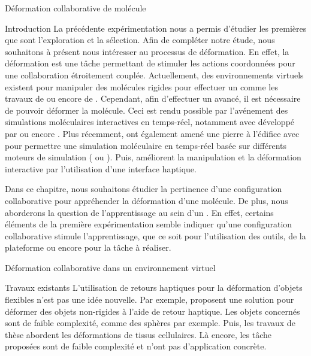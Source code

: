 \documentclass[myfrancais,ngerman,english,french]{mythesis}
\begin{document}
	\begin{mychapter}{Déformation collaborative de molécule}
		\begin{mysection}{Introduction}
			La précédente expérimentation nous a permis d'étudier les premières  que sont l'exploration et la sélection.
			Afin de compléter notre étude, nous souhaitons à présent nous intéresser au processus de déformation.
			En effet, la déformation est une tâche permettant de stimuler les actions coordonnées pour une collaboration étroitement couplée.
			Actuellement, des environnements virtuels existent pour manipuler des molécules rigides pour effectuer un  comme les travaux de  ou encore de .
			Cependant, afin d'effectuer un  avancé, il est nécessaire de pouvoir déformer la molécule.
			Ceci est rendu possible par l'avénement des simulations moléculaires interactives en temps-réel, notamment avec  développé par  ou encore .
			Plus récemment,  ont également amené une pierre à l'édifice avec \myMDDriver pour permettre une simulation moléculaire en temps-réel basée sur différents moteurs de simulation ( ou \myGromacs).
			Puis,  améliorent la manipulation et la déformation interactive par l'utilisation d'une interface haptique.

			Dans ce chapitre, nous souhaitons étudier la pertinence d'une configuration collaborative pour appréhender la déformation d'une molécule.
			De plus, nous aborderons la question de l'apprentissage au sein d'un .
			En effet, certains éléments de la première expérimentation semble indiquer qu'une configuration collaborative stimule l'apprentissage, que ce soit pour l'utilisation des outils, de la plateforme ou encore pour la tâche à réaliser.
		\end{mysection}
		\begin{mysection}{Déformation collaborative dans un environnement virtuel}
			\begin{mysubsection}{Travaux existants}
				L'utilisation de retours haptiques pour la déformation d'objets flexibles n'est pas une idée nouvelle.
				Par exemple,  proposent une solution pour déformer des objets non-rigides à l'aide de retour haptique.
				Les objets concernés sont de faible complexité, comme des sphères par exemple.
				Puis, les travaux de thèse  abordent les déformations de tissus cellulaires.
				Là encore, les tâche proposées sont de faible complexité et n'ont pas d'application concrète.


\end{mysubsection}
\end{mysection}
\end{mychapter}
\end{document}
